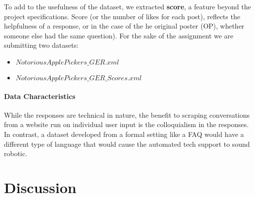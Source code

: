 \documentclass[10pt]{article}
\begin{document}
\begin{multicols}{2}
To add to the usefulness of the dataset, we extracted \textbf{score}, a feature beyond the project specifications. Score (or the number of likes for each post), reflects the helpfulness of a response, or in the case of the he original poster (OP), whether someone else had the same question). For the sake of the assignment we are submitting two datasets:
\begin{itemize}
\item{$NotoriousApplePickers\_GER.xml$}
\item{$NotoriousApplePickers\_GER\_Scores.xml$}
\end{itemize}

\paragraph{Data Characteristics}
While the responses are technical in nature, the benefit to scraping conversations from a website run on individual user input is the colloquialism in the responses. In contrast, a dataset developed from a formal setting like a FAQ would have a different type of language that would cause the automated tech support to sound robotic.\\






\section{Discussion}

\end{multicols}
\end{document}
